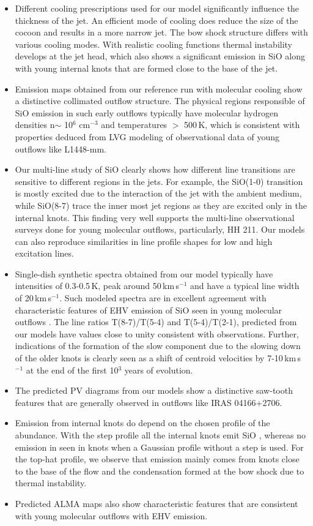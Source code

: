 \documentclass[useAMS,usenatbib]{mn2e}
\begin{document}
\begin{itemize}
\item Different cooling prescriptions used for our model
  significantly influence the thickness of the jet. An
  efficient mode of cooling does reduce the size of the cocoon and results
  in a more narrow jet. The bow shock structure
  differs with various cooling modes. With realistic cooling
  functions 
  thermal instability develops at the jet head, which also shows a significant emission in SiO
  along with young internal knots that are formed close to the base of
  the jet.
\item Emission maps obtained from our reference run with molecular
  cooling show a distinctive collimated outflow structure. The
  physical regions responsible of SiO emission in such early outflows
  typically have molecular hydrogen densities n$\sim$ 10$^{6}$
  cm$^{-3}$ and temperatures $>$ 500\,K, which is consistent with
  properties deduced from LVG modeling of observational data of
  young outflows like L1448-mm.
\item Our multi-line study of SiO clearly shows how different
  line transitions are sensitive to different regions in the jets. For
  example, the SiO(1-0) transition is mostly excited due to
  the interaction of the jet with the ambient medium, while SiO(8-7) 
  trace the inner most jet regions as
  they are excited only in the internal knots. 
  This finding very well
  supports the multi-line observational surveys done for young
  molecular outflows, particularly, HH 211. Our models
  can also reproduce similarities in line profile shapes for low and high
  excitation lines.
\item Single-dish synthetic spectra obtained from our model typically
  have intensities of 0.3-0.5\,K, peak around 50\,km\,s$^{-1}$ and have a
  typical line width of 20\,km\,s$^{-1}$. Such modeled spectra are in
  excellent agreement with characteristic features of EHV emission of
  SiO seen in young molecular outflows . The line ratios 
  T(8-7)/T(5-4) and T(5-4)/T(2-1), predicted from our models have values close to
  unity consistent with observations. Further,
  indications of the formation of the slow component due to the
  slowing down of the
  older knots is clearly seen as a shift of centroid velocities by
  7-10\,km\,s$^{-1}$ at the end of the first 10$^{3}$ years of evolution.
\item The predicted PV diagrams from our models show a distinctive
  saw-tooth features that are generally observed in outflows like IRAS
  04166+2706.
\item Emission from internal knots do depend on the chosen profile of
  the abundance. With the step profile all the internal knots emit SiO  
  , whereas no emission in
  seen in knots when a Gaussian profile without a step is used. For
  the top-hat profile, we observe that emission mainly
  comes from knots close to the base of the flow and the condensation
  formed at the bow shock due to thermal instability.
\item Predicted ALMA maps also show characteristic features that are
  consistent with young molecular outflows with EHV emission. 
\end{itemize}
\end{document}
